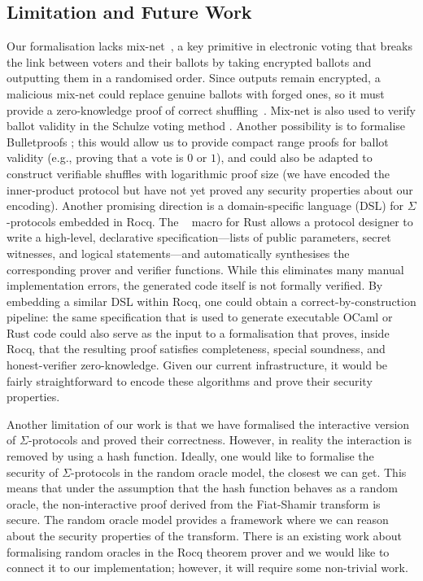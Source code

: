 \documentclass[sigconf, anonymous]{acmart}
\begin{document}
\subsection{Limitation and Future Work}
Our formalisation lacks mix-net~\cite{10.1145/358549.358563}, a key primitive in electronic voting that breaks the link between voters and their ballots by taking encrypted ballots and outputting them in a randomised order. Since outputs remain encrypted, a malicious mix-net could replace genuine ballots with forged ones, so it must provide a zero-knowledge proof of correct shuffling~\cite{10.1007/978-3-642-02620-1_28,10.1007/978-3-642-29011-4_17}. Mix-net is also used to verify ballot validity in the Schulze voting method \cite{haines2019verifiable}. Another possibility is to formalise Bulletproofs \cite{bunz2018bulletproofs}; this would allow us to provide compact range proofs for ballot validity (e.g., proving that a vote is $0$ or $1$), and could also be adapted to construct verifiable shuffles with logarithmic proof size (we have encoded the inner-product protocol but have not yet proved any security properties about our encoding). Another promising direction is a domain-specific language (DSL) for $\Sigma$-protocols embedded in Rocq. The \texttt{}~\cite{sigma-compiler,cryptoeprint:2026/794} macro for Rust allows a protocol designer to write a high-level, declarative specification---lists of public parameters, secret witnesses, and logical statements---and automatically synthesises the corresponding prover and verifier functions. While this eliminates many manual implementation errors, the generated code itself is not formally verified. By embedding a similar DSL within Rocq, one could obtain a correct-by-construction pipeline: the same specification that is used to generate executable OCaml or Rust code could also serve as the input to a formalisation that proves, inside Rocq, that the resulting proof satisfies completeness, special soundness, and honest-verifier zero-knowledge. Given our current infrastructure, it would be fairly straightforward to  encode these algorithms and prove their security properties. 
   

   Another limitation of our work is 
   that we have formalised the interactive version 
   of $\Sigma$-protocols and proved their correctness. However, 
   in reality the interaction is removed by 
   using a hash function. Ideally, one would like 
   to formalise the security of $\Sigma$-protocols in the random oracle 
   model, the closest we can get. This means that under the assumption 
   that the hash function behaves as a random oracle, the non-interactive 
   proof derived from the Fiat-Shamir transform \cite{10.5555/36664.36676} is secure. 
   The random oracle model provides a framework where we can 
   reason about the security properties  of 
   the transform. There is an existing 
   work about formalising random oracles in the Rocq theorem 
   prover \cite{10.1007/11617990_3} and we would like to 
   connect it to our implementation; however, it 
   will require some non-trivial work.
 
\end{document}
